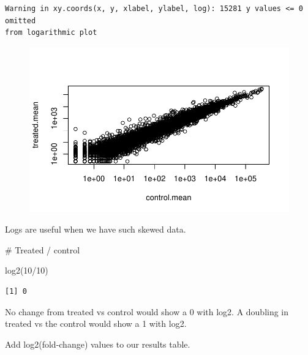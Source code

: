 \documentclass[
  letterpaper,
  DIV=11,
  numbers=noendperiod]{scrartcl}
\newenvironment{Shaded}{\begin{snugshade}}{\end{snugshade}}
\newcommand{\CommentTok}[1]{\textcolor[rgb]{0.37,0.37,0.37}{#1}}
\newcommand{\DecValTok}[1]{\textcolor[rgb]{0.68,0.00,0.00}{#1}}
\newcommand{\FunctionTok}[1]{\textcolor[rgb]{0.28,0.35,0.67}{#1}}
\newcommand{\NormalTok}[1]{\textcolor[rgb]{0.00,0.23,0.31}{#1}}
\newcommand{\OtherTok}[1]{\textcolor[rgb]{0.00,0.23,0.31}{#1}}
\newcommand{\SpecialCharTok}[1]{\textcolor[rgb]{0.37,0.37,0.37}{#1}}
\begin{document}
\begin{verbatim}
Warning in xy.coords(x, y, xlabel, ylabel, log): 15281 y values <= 0 omitted
from logarithmic plot
\end{verbatim}

\begin{figure}[H]

{\centering \includegraphics{Class13_files/figure-pdf/unnamed-chunk-15-1.pdf}

}

\end{figure}

Logs are useful when we have such skewed data.

\begin{Shaded}
\begin{Highlighting}[]
\CommentTok{\# Treated / control}

\FunctionTok{log2}\NormalTok{(}\DecValTok{10}\SpecialCharTok{/}\DecValTok{10}\NormalTok{)}
\end{Highlighting}
\end{Shaded}

\begin{verbatim}
[1] 0
\end{verbatim}

No change from treated vs control would show a 0 with log2. A doubling
in treated vs the control would show a 1 with log2.

Add log2(fold-change) values to our results table.

\begin{Shaded}
\end{Shaded}
\end{document}
